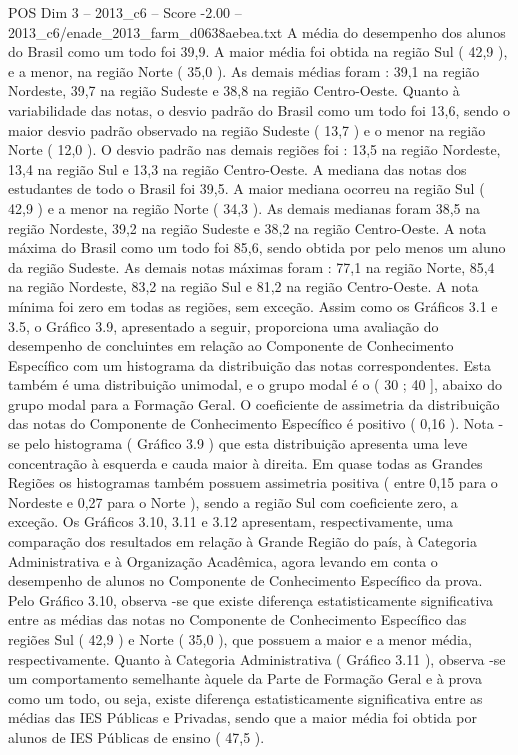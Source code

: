 \begin{textsample}{POS Dim 3 – 2013\_c6 – Score -2.00 – 2013\_c6/enade\_2013\_farm\_d0638aebea.txt}
A média do desempenho dos alunos do Brasil como um todo foi 39,9.
A maior média foi obtida na região Sul ( 42,9 ), e a menor, na região Norte ( 35,0 ).
As demais médias foram : 39,1 na região Nordeste, 39,7 na região Sudeste e 38,8 na região Centro-Oeste.
Quanto à variabilidade das notas, o desvio padrão do Brasil como um todo foi 13,6, sendo o maior desvio padrão observado na região Sudeste ( 13,7 ) e o menor na região Norte ( 12,0 ).
O desvio padrão nas demais regiões foi : 13,5 na região Nordeste, 13,4 na região Sul e 13,3 na região Centro-Oeste.
A mediana das notas dos estudantes de todo o Brasil foi 39,5.
A maior mediana ocorreu na região Sul ( 42,9 ) e a menor na região Norte ( 34,3 ).
As demais medianas foram 38,5 na região Nordeste, 39,2 na região Sudeste e 38,2 na região Centro-Oeste.
A nota máxima do Brasil como um todo foi 85,6, sendo obtida por pelo menos um aluno da região Sudeste.
As demais notas máximas foram : 77,1 na região Norte, 85,4 na região Nordeste, 83,2 na região Sul e 81,2 na região Centro-Oeste.
A nota mínima foi zero em todas as regiões, sem exceção.
Assim como os Gráficos 3.1 e 3.5, o Gráfico 3.9, apresentado a seguir, proporciona uma avaliação do desempenho de concluintes em relação ao Componente de Conhecimento Específico com um histograma da distribuição das notas correspondentes.
Esta também é uma distribuição unimodal, e o grupo modal é o ( 30 ; 40 ], abaixo do grupo modal para a Formação Geral.
O coeficiente de assimetria da distribuição das notas do Componente de Conhecimento Específico é positivo ( 0,16 ).
Nota -se pelo histograma ( Gráfico 3.9 ) que esta distribuição apresenta uma leve concentração à esquerda e cauda maior à direita.
Em quase todas as Grandes Regiões os histogramas também possuem assimetria positiva ( entre 0,15 para o Nordeste e 0,27 para o Norte ), sendo a região Sul com coeficiente zero, a exceção.
Os Gráficos 3.10, 3.11 e 3.12 apresentam, respectivamente, uma comparação dos resultados em relação à Grande Região do país, à Categoria Administrativa e à Organização Acadêmica, agora levando em conta o desempenho de alunos no Componente de Conhecimento Específico da prova.
Pelo Gráfico 3.10, observa -se que existe diferença estatisticamente significativa entre as médias das notas no Componente de Conhecimento Específico das regiões Sul ( 42,9 ) e Norte ( 35,0 ), que possuem a maior e a menor média, respectivamente.
Quanto à Categoria Administrativa ( Gráfico 3.11 ), observa -se um comportamento semelhante àquele da Parte de Formação Geral e à prova como um todo, ou seja, existe diferença estatisticamente significativa entre as médias das IES Públicas e Privadas, sendo que a maior média foi obtida por alunos de IES Públicas de ensino ( 47,5 ).

\end{textsample}
